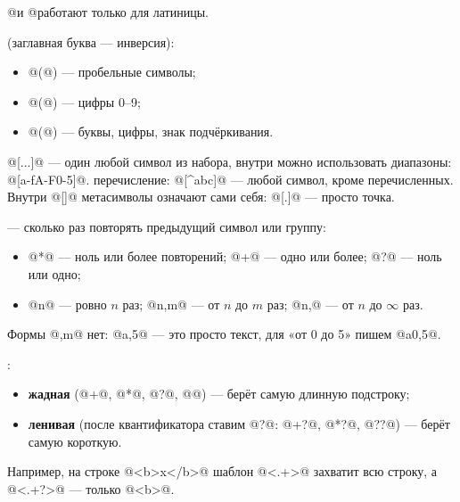 \documentclass[11pt,a4paper]{article}
\begin{document}
\begin{zam}
@\b@ и @\w@ работают только для латиницы.
\end{zam}

\begin{opr}
 (заглавная буква — инверсия):
\begin{itemize}
\item @\s@ (@\S@) — пробельные символы;
\item @\d@ (@\D@) — цифры 0–9;
\item @\w@ (@\W@) — буквы, цифры, знак подчёркивания.
\end{itemize}
\end{opr}

\begin{opr}
 @[...]@ — один любой символ из набора, внутри можно использовать диапазоны: @[a-fA-F0-5]@.
 перечисление: @[^abc]@ — любой символ, кроме перечисленных. Внутри @[]@ метасимволы означают сами себя:
@[.]@ — просто точка.
\end{opr}

\begin{opr}
 — сколько раз повторять предыдущий символ или группу:
\begin{itemize}
\item @*@ — ноль или более повторений; @+@ — одно или более; @?@ — ноль или одно;
\item @{n}@ — ровно $n$ раз; @{n,m}@ — от $n$ до $m$ раз; @{n,}@ — от $n$ до $\infty$ раз.
\end{itemize}
\end{opr}

\begin{zam}
Формы @{,m}@ нет: @a{,5}@ — это просто текст, для «от 0 до 5» пишем @a{0,5}@.
\end{zam}

\begin{opr}
:
\begin{itemize}
\item \textbf{жадная} (@+@, @*@, @?@, @{}@) — берёт самую длинную подстроку;
\item \textbf{ленивая} (после квантификатора ставим @?@: @+?@, @*?@, @??@) — берёт самую короткую.
\end{itemize}
\end{opr}

Например, на строке @<b>x</b>@ шаблон @<.+>@ захватит всю строку, а @<.+?>@ — только @<b>@.
\end{document}
